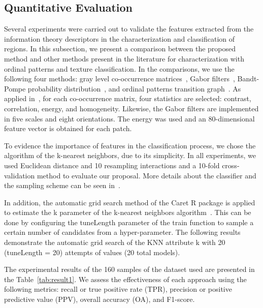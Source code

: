 \documentclass[journal]{IEEEtran}
\begin{document}
\subsection{Quantitative Evaluation}

Several experiments were carried out to validate the features extracted from the information theory descriptors in the characterization and classification of regions.
In this subsection, we present a comparison between the proposed method and other methods present in the literature for characterization with ordinal patterns and texture classification.
In the comparisons, we use the following four methods: gray level co-occurrence matrices~\cite{kourgli2012texture}, Gabor filters~\cite{weldon1996efficient}, Bandt-Pompe probability distribution~\cite{Bandt2002Permutation}, and ordinal patterns transition graph~\cite{borges2019learning}.
As applied in~\cite{guan2019covariance}, for each co-occurrence matrix, four statistics are selected: contrast, correlation, energy, and homogeneity.
Likewise, the Gabor filters are implemented in five scales and eight orientations.
The energy was used and an 80-dimensional feature vector is obtained for each patch.

To evidence the importance of features in the classification process, we chose the algorithm of the k-nearest neighbors, due to its simplicity.
In all experiments, we used Euclidean distance and 10 resampling interactions and a 10-fold cross-validation method to evaluate our proposal.
More details about the classifier and the sampling scheme can be seen in~\cite{mitchell1997machine}. 

In addition, the automatic grid search method of the Caret R package is applied to estimate the k parameter of the k-nearest neighbors algorithm~\cite{kuhn2008building}.
This can be done by configuring the tuneLength parameter of the train function to sample a certain number of candidates from a hyper-parameter.
The following results demonstrate the automatic grid search of the KNN attribute k with 20 (tuneLength = 20) attempts of values (20 total models).

The experimental results of the 160 samples of the dataset used are presented in the Table~\ref{tab:result1}.
We assess the effectiveness of each approach using the following metrics: recall or true positive rate (TPR), precision or positive predictive value (PPV), overall accuracy (OA), and F1-score.
\end{document}

